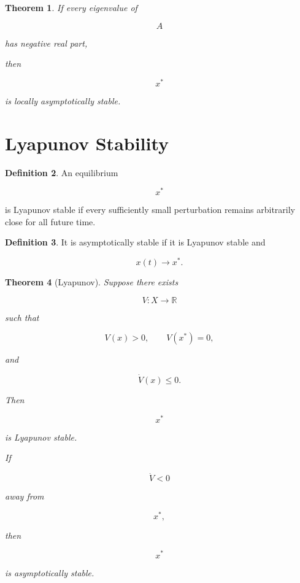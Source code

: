 \documentclass[11pt]{book}
\numberwithin{equation}{chapter}
\theoremstyle{definition}
\newtheorem{definition}{Definition}[chapter]
\theoremstyle{plain}
\newtheorem{theorem}[definition]{Theorem}
\begin{document}

\begin{theorem}

If every eigenvalue of

\[
A
\]

has negative real part,

then

\[
x^*
\]

is locally asymptotically stable.

\end{theorem}


\section{Lyapunov Stability}

\begin{definition}

An equilibrium

\[
x^*
\]

is Lyapunov stable if every sufficiently small perturbation remains
arbitrarily close for all future time.

\end{definition}


\begin{definition}

It is asymptotically stable if it is Lyapunov stable and

\[
x(t)
\rightarrow
x^*.
\]

\end{definition}


\begin{theorem}[Lyapunov]

Suppose there exists

\[
V:X\rightarrow\mathbb R
\]

such that

\[
V(x)>0,
\qquad
V(x^*)=0,
\]

and

\[
\dot V(x)\le0.
\]

Then

\[
x^*
\]

is Lyapunov stable.

If

\[
\dot V<0
\]

away from

\[
x^*,
\]

then

\[
x^*
\]

is asymptotically stable.

\end{theorem}
\end{document}
